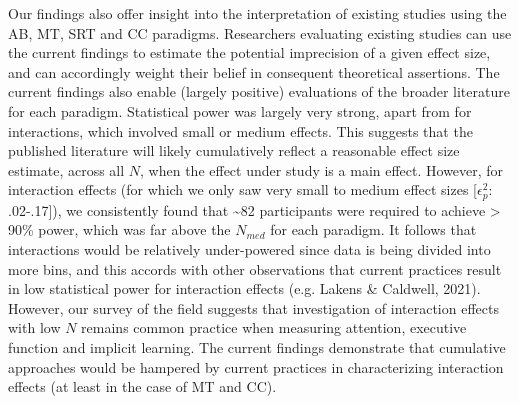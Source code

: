 \documentclass[
  man]{apa6}
\begin{document}
Our findings also offer insight into the interpretation of existing studies using the AB, MT, SRT and CC paradigms. Researchers evaluating existing studies can use the current findings to estimate the potential imprecision of a given effect size, and can accordingly weight their belief in consequent theoretical assertions. The current findings also enable (largely positive) evaluations of the broader literature for each paradigm. Statistical power was largely very strong, apart from for interactions, which involved small or medium effects. This suggests that the published literature will likely cumulatively reflect a reasonable effect size estimate, across all \(N\), when the effect under study is a main effect. However, for interaction effects (for which we only saw very small to medium effect sizes {[}\(\epsilon_{p}^2\): .02-.17{]}), we consistently found that \textasciitilde82 participants were required to achieve \textgreater{} 90\% power, which was far above the \(N_{med}\) for each paradigm. It follows that interactions would be relatively under-powered since data is being divided into more bins, and this accords with other observations that current practices result in low statistical power for interaction effects (e.g. Lakens \& Caldwell, 2021). However, our survey of the field suggests that investigation of interaction effects with low \(N\) remains common practice when measuring attention, executive function and implicit learning. The current findings demonstrate that cumulative approaches would be hampered by current practices in characterizing interaction effects (at least in the case of MT and CC).
\end{document}
